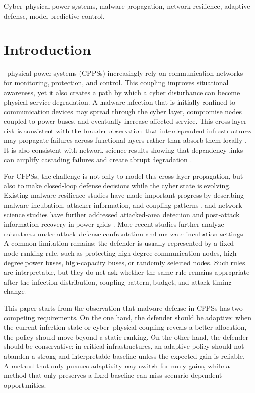 \documentclass[lettersize,journal]{IEEEtran}
\begin{document}
\begin{IEEEkeywords}
Cyber--physical power systems, malware propagation, network resilience, adaptive defense, model predictive control.
\end{IEEEkeywords}



\section{Introduction}

--physical power systems (CPPSs) increasingly rely on communication networks for monitoring, protection, and control. This coupling improves situational awareness, yet it also creates a path by which a cyber disturbance can become physical service degradation. A malware infection that is initially confined to communication devices may spread through the cyber layer, compromise nodes coupled to power buses, and eventually increase affected service. This cross-layer risk is consistent with the broader observation that interdependent infrastructures may propagate failures across functional layers rather than absorb them locally \cite{rinaldi2001interdependencies}. It is also consistent with network-science results showing that dependency links can amplify cascading failures and create abrupt degradation \cite{buldyrev2010catastrophic}.

For CPPSs, the challenge is not only to model this cross-layer propagation, but also to make closed-loop defense decisions while the cyber state is evolving. Existing malware-resilience studies have made important progress by describing malware incubation, attacker information, and coupling patterns \cite{xu2020analysis}, and network-science studies have further addressed attacked-area detection and post-attack information recovery in power grids \cite{soltan2019react}. More recent studies further analyze robustness under attack--defense confrontation and malware incubation settings \cite{xu2023resilience,zhang2025robustness}. A common limitation remains: the defender is usually represented by a fixed node-ranking rule, such as protecting high-degree communication nodes, high-degree power buses, high-capacity buses, or randomly selected nodes. Such rules are interpretable, but they do not ask whether the same rule remains appropriate after the infection distribution, coupling pattern, budget, and attack timing change.

This paper starts from the observation that malware defense in CPPSs has two competing requirements. On the one hand, the defender should be adaptive: when the current infection state or cyber--physical coupling reveals a better allocation, the policy should move beyond a static ranking. On the other hand, the defender should be conservative: in critical infrastructures, an adaptive policy should not abandon a strong and interpretable baseline unless the expected gain is reliable. A method that only pursues adaptivity may switch for noisy gains, while a method that only preserves a fixed baseline can miss scenario-dependent opportunities.
\end{document}
